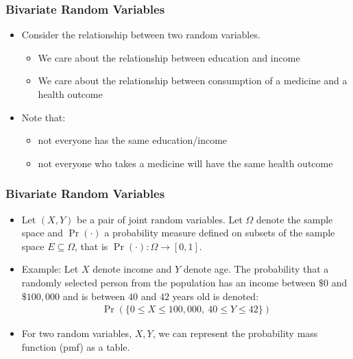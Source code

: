 

\begin{frame}
\frametitle{Bivariate Random Variables} 
\begin{itemize}
\item Consider the relationship between two random variables.
\begin{itemize}
\item We care about the relationship between education and income
\item We care about the relationship between consumption of a medicine and a health outcome
\end{itemize}
\item Note that:
\begin{itemize}
\item not everyone has the same education/income
\item not everyone who takes a medicine will have the same health outcome
\end{itemize}
\end{itemize}
\end{frame}


\begin{frame}
\frametitle{Bivariate Random Variables} 
\begin{itemize}
\item Let $(X,Y)$ be a pair of joint random variables. Let $\Omega$ denote the sample space and $\Pr(\cdot)$ a probability measure defined on subsets of the sample space $E\subseteq\Omega$, that is $\Pr(\cdot)\colon\Omega\to[0,1]$.
\item Example: Let $X$ denote income and $Y$ denote age. The probability that a randomly selected person from the population has an income between $\$0$ and $\$100,000$ and is between $40$ and $42$ years old is denoted:
\begin{align*}
\Pr(\{0\leq X\leq 100,000,~ 40\leq Y\leq 42\})
\end{align*} 
\item For two random variables, $X,Y$, we can represent the probability mass function (pmf) as a table. 
\end{itemize}
\end{frame}


